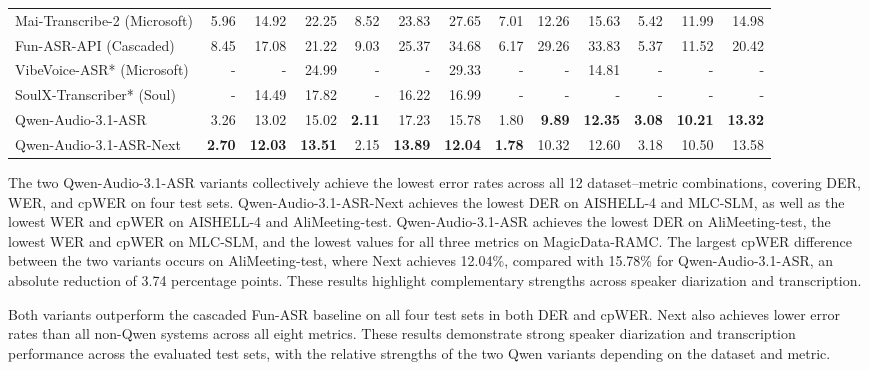 \documentclass{article}
\begin{document}
\begin{table}[t]
{\begin{tabular}{lrrrrrrrrrrrr}
        Mai-Transcribe-2 (Microsoft) & 5.96 & 14.92 & 22.25 & 8.52 & 23.83 & 27.65 & 7.01 & 12.26 & 15.63 & 5.42 & 11.99 & 14.98 \\
        Fun-ASR-API (Cascaded) & 8.45 & 17.08 & 21.22 & 9.03 & 25.37 & 34.68 & 6.17 & 29.26 & 33.83 & 5.37 & 11.52 & 20.42 \\
        VibeVoice-ASR* (Microsoft) & - & - & 24.99 & - & - & 29.33 & - & - & 14.81 & - & - & - \\
        SoulX-Transcriber* (Soul) & - & 14.49 & 17.82 & - & 16.22 & 16.99 & - & - & - & - & - & - \\
        \midrule
        \rowcolor{QwenPurpleLight}
        Qwen-Audio-3.1-ASR & 3.26 & 13.02 & 15.02 & \textbf{2.11} & 17.23 & 15.78 & 1.80 & \textbf{9.89} & \textbf{12.35} & \textbf{3.08} & \textbf{10.21} & \textbf{13.32} \\
        \rowcolor{QwenPurpleLight}
        Qwen-Audio-3.1-ASR-Next & \textbf{2.70} & \textbf{12.03} & \textbf{13.51} & 2.15 & \textbf{13.89} & \textbf{12.04} & \textbf{1.78} & 10.32 & 12.60 & 3.18 & 10.50 & 13.58 \\
        \bottomrule
    \end{tabular}}
    \endgroup
\end{table}



%
%
%
%
%
%
%
%
%
%
%
%
%
%
%
%
%
%
%
%
%
%
%
%
%
%
%
%
%
%
%
%
%
%
%
%

The two Qwen-Audio-3.1-ASR variants collectively achieve the lowest error rates across all 12 dataset--metric combinations, covering DER, WER, and cpWER on four test sets. Qwen-Audio-3.1-ASR-Next achieves the lowest DER on AISHELL-4 and MLC-SLM, as well as the lowest WER and cpWER on AISHELL-4 and AliMeeting-test. Qwen-Audio-3.1-ASR achieves the lowest DER on AliMeeting-test, the lowest WER and cpWER on MLC-SLM, and the lowest values for all three metrics on MagicData-RAMC. The largest cpWER difference between the two variants occurs on AliMeeting-test, where Next achieves 12.04\%, compared with 15.78\% for Qwen-Audio-3.1-ASR, an absolute reduction of 3.74 percentage points. These results highlight complementary strengths across speaker diarization and transcription.

Both variants outperform the cascaded Fun-ASR baseline on all four test sets in both DER and cpWER. Next also achieves lower error rates than all non-Qwen systems across all eight metrics. These results demonstrate strong speaker diarization and transcription performance across the evaluated test sets, with the relative strengths of the two Qwen variants depending on the dataset and metric.
\end{document}
